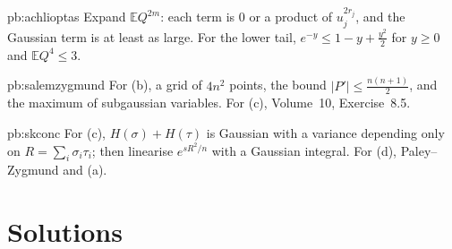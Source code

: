 \begin{hint}{pb:achlioptas}
Expand $\mathbb EQ^{2m}$: each term is $0$ or a product of $u_j^{2r_j}$, and the Gaussian term is at least as large. For the lower tail, $e^{-y}\le1-y+\frac{y^2}2$ for $y\ge0$ and
$\mathbb EQ^4\le3$.
\end{hint}

\begin{hint}{pb:salemzygmund}
For (b), a grid of $4n^2$ points, the bound $|P'|\le\frac{n(n+1)}2$, and the maximum of subgaussian variables. For (c), Volume~10, Exercise~8.5.
\end{hint}

\begin{hint}{pb:skconc}
For (c), $H(\sigma)+H(\tau)$ is Gaussian with a variance depending only on $R=\sum_i\sigma_i\tau_i$; then linearise $e^{sR^2/n}$ with a Gaussian integral. For (d),
Paley--Zygmund and (a).
\end{hint}

\section*{Solutions}

